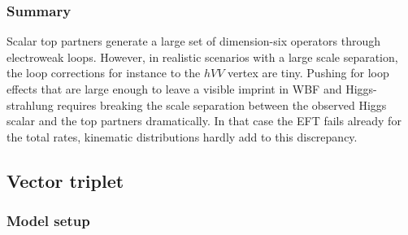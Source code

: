\subsubsection{Summary}

Scalar top partners generate a large set of dimension-six operators
through electroweak loops. However, in realistic scenarios with a
large scale separation, the loop corrections for instance to the $hVV$
vertex are tiny.  Pushing for loop effects that are large enough to
leave a visible imprint in WBF and Higgs-strahlung requires breaking
the scale separation between the observed Higgs scalar and the top
partners dramatically. In that case the EFT fails already for the
total rates, kinematic distributions hardly add to this discrepancy.



\subsection{Vector triplet}
\label{sec:validity_triplet}

\subsubsection{Model setup}

